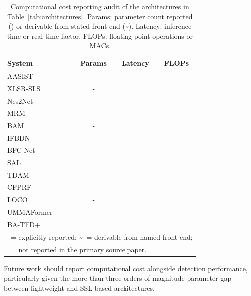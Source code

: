\documentclass[journal]{IEEEtran}
\newcommand{\cmark}{\ding{51}}
\newcommand{\xmark}{\ding{55}}
\begin{document}
\begin{table}[t]
\centering
\caption{Computational cost reporting audit of the architectures in Table~\ref{tab:architectures}. Params: parameter count reported (\cmark) or derivable from stated front-end (\textasciitilde). Latency: inference time or real-time factor. FLOPs: floating-point operations or MACs.}
\label{tab:cost_audit}
\small
\begin{tabular}{lccc}
\toprule
\textbf{System} & \textbf{Params} & \textbf{Latency} & \textbf{FLOPs} \\
\midrule
AASIST~\cite{jung2022aasist}             & \cmark  & \xmark & \xmark \\
XLSR-SLS~\cite{zhang2024xlrsls}          & \textasciitilde & \xmark & \xmark \\
Nes2Net~\cite{liu2025nes2net}            & \xmark  & \xmark & \xmark \\
MRM~\cite{zhang2023partialspoof}         & \xmark  & \xmark & \xmark \\
BAM~\cite{zhong2024bam}                  & \textasciitilde & \xmark & \xmark \\
IFBDN~\cite{cai2024ifbdn}               & \xmark  & \xmark & \xmark \\
BFC-Net~\cite{zhou2025bfcnet}            & \xmark  & \xmark & \xmark \\
SAL~\cite{sal2026}                       & \xmark  & \xmark & \xmark \\
TDAM~\cite{li2025tdam}                   & \xmark  & \xmark & \xmark \\
CFPRF~\cite{wu2024cfprf}                 & \xmark  & \xmark & \xmark \\
LOCO~\cite{wu2025loco}                   & \textasciitilde & \xmark & \xmark \\
UMMAFormer~\cite{zhang2023ummaformer}    & \xmark  & \xmark & \xmark \\
BA-TFD+~\cite{cai2023lavdf_cviu}        & \xmark  & \xmark & \xmark \\
\bottomrule
\multicolumn{4}{l}{\footnotesize \cmark\ = explicitly reported; \textasciitilde\ = derivable from named front-end;} \\
\multicolumn{4}{l}{\footnotesize \xmark\ = not reported in the primary source paper.}
\end{tabular}
\end{table}

Future work should report computational cost alongside detection performance, particularly given the more-than-three-orders-of-magnitude parameter gap between lightweight and SSL-based architectures.
\end{document}
